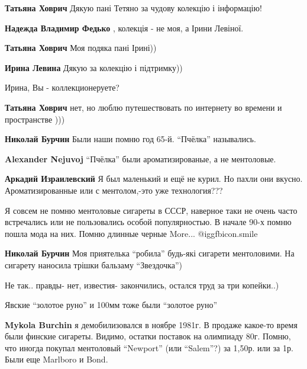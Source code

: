 \begin{itemize}
\begin{itemize}
\begin{itemize}
\textbf{Татьяна Ховрич} Дякую пані Тетяно за чудову колекцію і інформацію!

\textbf{Надежда Владимир Федько} , колекція - не моя, а Ірини Левіної.

\textbf{Татьяна Ховрич} Моя подяка пані Ірині))

\textbf{Ирина Левина} Дякую за колекцію і підтримку))

Ирина, Вы - коллекционеруете?

\textbf{Татьяна Ховрич} нет, но люблю путешествовать по интернету во времени и пространстве )))

\end{itemize} %

\textbf{Николай Бурчин} Были наши помню год 65-й. \enquote{Пчёлка} назывались.

\begin{itemize} %
\textbf{Alexander Nejuvoj} \enquote{Пчёлка} были ароматизированые, а не ментоловые.

\textbf{Аркадий Израилевский} Я был маленький и ещё не курил. Но пахли они вкусно. Ароматизированные или с ментолом,-это уже технология???
\end{itemize} %


Я совсем не помню ментоловые сигареты в СССР, наверное таки не очень часто
встречались или не пользовались особой популярностью. В начале 90-х помню пошла
мода на них. Помню длинные черные More...  @igg{fbicon.smile} 

\textbf{Николай Бурчин} Моя приятелька \enquote{робила} будь-які сигарети ментоловими. На сигарету наносила трішки бальзаму \enquote{Звездочка})

Не так.. правды- нет, известия- закончились, остался труд за три копейки..)

Явские \enquote{золотое руно} и 100мм тоже были \enquote{золотое руно}

\textbf{Mykola Burchin} я демобилизовался в ноябре 1981г. В продаже какое-то время были
финские сигареты. Видимо, остатки поставок на олимпиаду 80г. Помню, что иногда
покупал ментоловый \enquote{Newport} (или \enquote{Salem}?) за 1,50р. или за 1р. Были еще
Marlboro и Bond.


\end{itemize}
\end{itemize}
